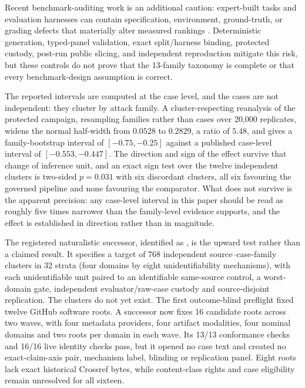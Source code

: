 Recent benchmark-auditing work is an additional caution: expert-built tasks and evaluation harnesses can contain specification, environment, ground-truth, or grading defects that materially alter measured rankings \citep{benchguard2026,autobenchmarkaudit2026,hal2025}. Deterministic generation, typed-panel validation, exact split/harness binding, protected custody, post-run public slicing, and independent reproduction mitigate this risk, but these controls do not prove that the 13-family taxonomy is complete or that every benchmark-design assumption is correct.

The reported intervals are computed at the case level, and the cases are not independent: they cluster by attack family. A cluster-respecting reanalysis of the protected campaign, resampling families rather than cases over 20{,}000 replicates, widens the normal half-width from $0.0528$ to $0.2829$, a ratio of $5.48$, and gives a family-bootstrap interval of $[-0.75,-0.25]$ against a published case-level interval of $[-0.553,-0.447]$. The direction and sign of the effect survive that change of inference unit, and an exact sign test over the twelve independent clusters is two-sided $p=0.031$ with six discordant clusters, all six favouring the governed pipeline and none favouring the comparator. What does not survive is the apparent precision: any case-level interval in this paper should be read as roughly five times narrower than the family-level evidence supports, and the effect is established in direction rather than in magnitude.

The registered naturalistic successor, identified as
, is the upward test rather than a claimed result.  It
specifies a target of 768 independent source--case-family clusters in 32 strata
(four domains by eight unidentifiability mechanisms), with each unidentifiable
unit paired to an identifiable same-source control, a worst-domain gate,
independent evaluator/raw-case custody and source-disjoint replication. The
clusters do not yet exist. The first outcome-blind preflight fixed twelve
GitHub software roots. A successor now fixes 16 candidate roots across two
waves, with four metadata providers, four artifact modalities, four nominal
domains and two roots per domain in each wave. Its 13/13 conformance checks
and 16/16 live identity checks pass, but it opened no case text and created no
exact-claim-axis pair, mechanism label, blinding or replication panel. Eight
roots lack exact historical Crossref bytes, while content-class rights and
case eligibility remain unresolved for all sixteen.

